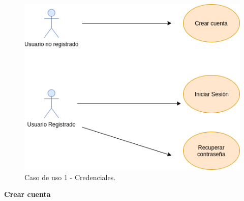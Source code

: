 \begin{figure}[H]
	\centering
	\includegraphics[scale=0.5]{imagenes/uso1.png}
	\caption{Caso de uso 1 - Credenciales.}
	\label{Caso de uso 1}
\end{figure}

\textbf{Crear cuenta}

